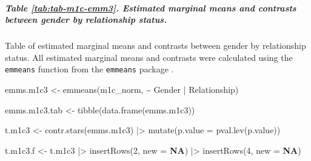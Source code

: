 \documentclass[
  bookmarksnumbered]{article}
\newenvironment{Shaded}{\begin{snugshade}}{\end{snugshade}}
\newcommand{\AttributeTok}[1]{\textcolor[rgb]{0.80,0.80,0.80}{#1}}
\newcommand{\ConstantTok}[1]{\textcolor[rgb]{0.86,0.64,0.64}{\textbf{#1}}}
\newcommand{\DecValTok}[1]{\textcolor[rgb]{0.86,0.86,0.80}{#1}}
\newcommand{\FunctionTok}[1]{\textcolor[rgb]{0.94,0.94,0.56}{#1}}
\newcommand{\NormalTok}[1]{\textcolor[rgb]{0.80,0.80,0.80}{#1}}
\newcommand{\OtherTok}[1]{\textcolor[rgb]{0.94,0.94,0.56}{#1}}
\newcommand{\SpecialCharTok}[1]{\textcolor[rgb]{0.86,0.64,0.64}{#1}}
\begin{document}
\subparagraph{Table \ref{tab:tab-m1c-emm3}. Estimated marginal means and contrasts between gender by relationship status.}\label{table-reftabtab-m1c-emm3.-estimated-marginal-means-and-contrasts-between-gender-by-relationship-status.}

Table of estimated marginal means and contrasts between gender by relationship status. All estimated marginal means and contrasts were calculated using the \texttt{emmeans} function from the \texttt{emmeans} package \autocite{emmeanscit}.

\begin{Shaded}
\begin{Highlighting}[]
\NormalTok{emms.m1c3 }\OtherTok{\textless{}{-}} \FunctionTok{emmeans}\NormalTok{(m1c\_norm, }\SpecialCharTok{\textasciitilde{}}\NormalTok{ Gender }\SpecialCharTok{|}\NormalTok{ Relationship)}

\NormalTok{emms.m1c3.tab }\OtherTok{\textless{}{-}} \FunctionTok{tibble}\NormalTok{(}\FunctionTok{data.frame}\NormalTok{(emms.m1c3))}

\NormalTok{t.m1c3 }\OtherTok{\textless{}{-}} \FunctionTok{contr.stars}\NormalTok{(emms.m1c3) }\SpecialCharTok{|\textgreater{}} 
  \FunctionTok{mutate}\NormalTok{(}\AttributeTok{p.value =} \FunctionTok{pval.lev}\NormalTok{(p.value))}

\NormalTok{t.m1c3.f }\OtherTok{\textless{}{-}}\NormalTok{ t.m1c3 }\SpecialCharTok{|\textgreater{}} 
  \FunctionTok{insertRows}\NormalTok{(}\DecValTok{2}\NormalTok{, }\AttributeTok{new =} \ConstantTok{NA}\NormalTok{) }\SpecialCharTok{|\textgreater{}}
  \FunctionTok{insertRows}\NormalTok{(}\DecValTok{4}\NormalTok{, }\AttributeTok{new =} \ConstantTok{NA}\NormalTok{)}


\end{Highlighting}
\end{Shaded}
\end{document}
